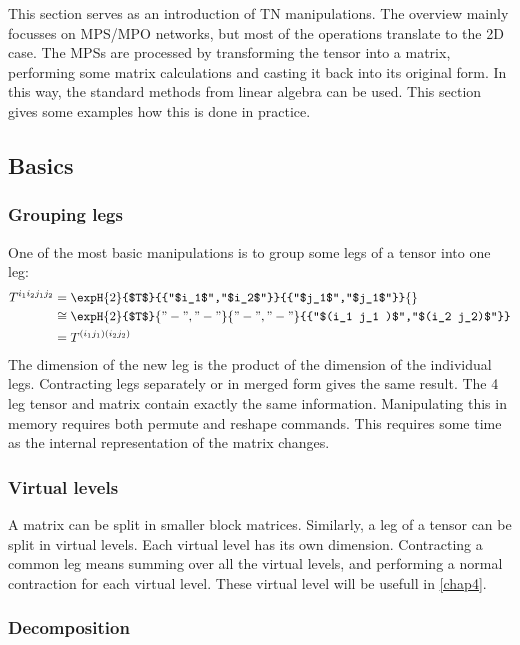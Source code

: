 This section serves as an introduction of \Gls{TN} manipulations. The overview mainly focusses on \Gls{MPS}/\Gls{MPO} networks, but most of the operations translate to the 2D case.
The \Glspl{MPS} are processed by transforming the tensor into a matrix, performing some matrix calculations and casting it back into its original form. In this way, the standard methods from linear algebra can be used. This section gives some examples how this is done in practice.

\subsection{Basics}

\subsubsection{Grouping legs}
One of the most basic manipulations is to group some legs of a tensor into one leg:
\begin{equation}
    \begin{split}
        T^{i_1 i_2 j_1 j_2} &=  \expH{2}{$T$}{{"$i_1$","$i_2$"}}{{"$j_1$","$j_1$"}}{} \\
        & \cong \expH{2}{$T$}{{"-","-"}}{{"-","-"}}{{"$(i_1 j_1 )$","$(i_2 j_2)$"}} \\
        &= T^{ (i_1 j_1 ) (i_2 j_2) } \\
    \end{split}
\end{equation}
The dimension of the new leg is the product of the dimension of the individual legs. Contracting legs separately or in merged form gives the same result. The 4 leg tensor and matrix contain exactly the same information. Manipulating this in memory requires both permute and reshape commands. This requires some time as the internal representation of the matrix changes.

\subsubsection{Virtual levels}
A matrix can be split in smaller block matrices. Similarly, a leg of a tensor can be split in virtual levels. Each virtual level has its own dimension. Contracting a common leg means summing over all the virtual levels, and performing a normal contraction for each virtual level. These virtual level will be usefull in \cref{chap4}.

\subsubsection{Decomposition} \label{decompMPO}
\def \figone {\expH{2}{$O^{u v,v w}$}{{"$i_1$","$i_2$"}}{{"$j_1$","$j_1$"}}{{"u","w"}}}

